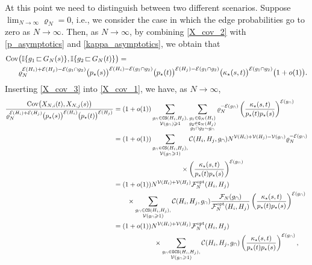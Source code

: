 \documentclass[11pt,reqno]{amsart}
\numberwithin{equation}{section}
\begin{document}
At this point we need to distinguish between two different scenarios. {Suppose $\lim_{N\to\infty}\varrho_N = 0$, i.e., we consider the case in which the edge probabilities go to zero as $N\to\infty$.} Then,
as $N\to\infty$, by combining \eqref{X_cov_2} with \eqref{p_asymptotics} and \eqref{kappa_asymptotics}, we obtain that
\begin{align}
    \operatorname{Cov}&\bigl(\mathbb{I}\{g_1{\,\sqsubset\,} G_N(s)\}, \mathbb{I}\{g_2{\,\sqsubset\,} G_N(t)\}\bigr) =\notag\\ &\varrho_N^{\mathcal{E}({H}_i) + \mathcal{E}({H}_j) - \mathcal{E}(g_1\cap g_2)}\bigl(p_{\star}(s)\bigr)^{\mathcal{E}({H}_i) - \mathcal{E}(g_1\cap g_2)}\bigl(p_{\star}(t)\bigr)^{\mathcal{E}({H}_j) - \mathcal{E}(g_1\cap g_2)}
    \bigl(\kappa_{\star}(s,t)\bigr)^{\mathcal{E}(g_1\cap g_2)}\bigl(1+o(1)\bigr).\label{X_cov_3}
\end{align}
Inserting \eqref{X_cov_3} into \eqref{X_cov_1}, we have, as $N\to\infty$,
\begin{align*}
    \frac{\operatorname{Cov}\bigl(X_{N,i}(t), X_{N,j}(s)\bigr)}{\varrho_N^{\mathcal{E}({H}_i)+\mathcal{E}({H}_j)}\bigl(p_{\star}(s)\bigr)^{\mathcal{E}({H}_i)}\bigl(p_{\star}(t)\bigr)^{\mathcal{E}({H}_j)}}
    &=(1+o(1))\sum_{\substack{g_{\cap}\in{\tt CS}({H}_i,{H}_j),\\ \mathcal{V}{(g_{\cap})\geqslant 1}}}\sum_{\substack{g_1\in{\tt G}_N({H}_i) \\ g_2\in{\tt G}_N({H}_j) \\ g_1\cap g_2\sim {g_{\cap}}}}\varrho_N^{-\mathcal{E}(g_{\cap})}\left(\frac{\kappa_{\star}(s,t)}{p_{\star}(t)p_{\star}(s)}\right)^{\mathcal{E}(g_{\cap})}\\
    &=(1+o(1))\sum_{\substack{g_{\cap}\in{\tt CS}({H}_i,{H}_j),\\ \mathcal{V}(g_{\cap}\geqslant 1)}}\mathcal{C}({H}_i,{H}_j,g_{\cap})N^{\mathcal{V}({H}_i) + \mathcal{V}({H}_j) - \mathcal{V}(g_{\cap})}\varrho_N^{-\mathcal{E}(g_{\cap})}\\
    &\qquad\qquad\qquad\qquad\qquad\times \left(\frac{\kappa_{\star}(s,t)}{p_{\star}(t)p_{\star}(s)}\right)^{\mathcal{E}(g_{\cap})}\\
    &=(1+o(1)){N^{\mathcal{V}({H}_i) + \mathcal{V}({H}_j)}}{\mathcal{F}_{N}^{\rm opt}({H}_i,{H}_j)}\\
    &\qquad\times \sum_{\substack{g_{\cap}\in{\tt CS}({H}_i,{H}_j),\\ \mathcal{V}(g_{\cap}\geqslant 1)}}\mathcal{C}({H}_i,{H}_j,g_{\cap})\frac{\mathcal{F}_N(g_{\cap})}{\mathcal{F}_N^{\rm opt}({H}_i,{H}_j)}\left(\frac{\kappa_{\star}(s,t)}{p_{\star}(t)p_{\star}(s)}\right)^{\mathcal{E}(g_{\cap})}\\
    &=(1+o(1)){N^{\mathcal{V}({H}_i) + \mathcal{V}({H}_j)}}{\mathcal{F}_{N}^{\rm opt}({H}_i,{H}_j)}\\
    &\qquad\qquad\qquad\times \sum_{\substack{g_{\cap}\in{\tt OCS}({H}_i,{H}_j),\\ \mathcal{V}(g_{\cap}\geqslant 1)}}\mathcal{C}({H}_i,{H}_j,g_{\cap})\left(\frac{\kappa_{\star}(s,t)}{p_{\star}(t)p_{\star}(s)}\right)^{\mathcal{E}(g_{\cap})},
\end{align*}
\end{document}
